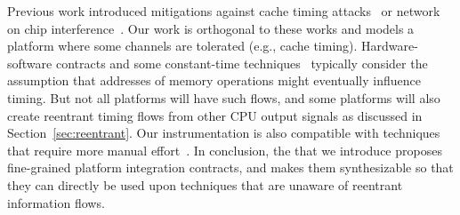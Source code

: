 Previous work introduced mitigations against cache timing attacks~\cite{kar2023mitigating,saileshwar2021mirage,giner2023scatter,werner2019scattercache,qureshi2018ceaser} or network on chip interference~\cite{wassel2013surfnoc,wang2012efficient,schoeberl2012statically,psarras2015phasenoc,alonso2019low,sadeghi2019toward}.
Our work is orthogonal to these works and models a platform where some channels are tolerated (e.g., cache timing).
Hardware-software contracts and some constant-time techniques~\cite{guarnieri2021hardware,wang2023specification,tan2025contractshadowlogic} typically consider the assumption that addresses of memory operations might eventually influence timing.
But not all platforms will have such flows, and some platforms will also create reentrant timing flows from other CPU output signals as discussed in Section~\ref{sec:reentrant}.
Our instrumentation is also compatible with techniques that require more manual effort~\cite{fastpath}.
In conclusion, the \PICI that we introduce proposes fine-grained platform integration contracts, and makes them synthesizable so that they can directly be used upon techniques that are unaware of reentrant information flows.
